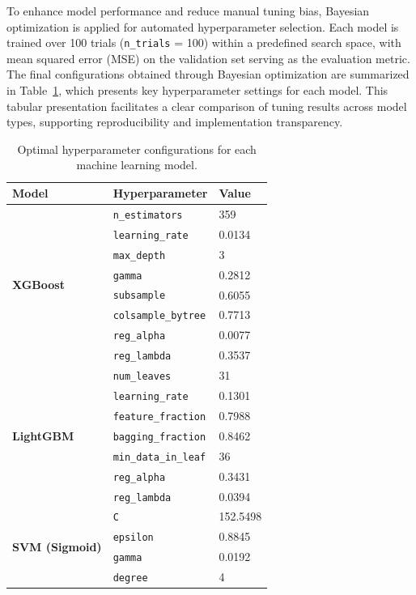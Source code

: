 To enhance model performance and reduce manual tuning bias, Bayesian optimization is applied for automated hyperparameter selection. 
Each model is trained over 100 trials (\texttt{n\_trials} = 100) within a predefined search space, with mean squared error (MSE) on the validation set serving as the evaluation metric. 
The final configurations obtained through Bayesian optimization are summarized in Table~\ref{tab:hyperparams}, which presents key hyperparameter settings for each model. 
This tabular presentation facilitates a clear comparison of tuning results across model types, supporting reproducibility and implementation transparency.

\begin{table}[!t]
    \centering
    \caption{Optimal hyperparameter configurations for each machine learning model.\label{tab:hyperparams}}
    \begin{tabular}{p{} p{} p{}<{\centering}}
        \toprule
        \textbf{Model} & \textbf{Hyperparameter} & \textbf{Value} \\
        \midrule
        \multirow{8}{*}{\textbf{XGBoost}} 
        & \texttt{n\_estimators} & 359 \\
        & \texttt{learning\_rate} & 0.0134 \\
        & \texttt{max\_depth} & 3 \\
        & \texttt{gamma} & 0.2812 \\
        & \texttt{subsample} & 0.6055 \\
        & \texttt{colsample\_bytree} & 0.7713 \\
        & \texttt{reg\_alpha} & 0.0077 \\
        & \texttt{reg\_lambda} & 0.3537 \\
        \midrule
        \multirow{7}{*}{\textbf{LightGBM}} 
        & \texttt{num\_leaves} & 31 \\
        & \texttt{learning\_rate} & 0.1301 \\
        & \texttt{feature\_fraction} & 0.7988 \\
        & \texttt{bagging\_fraction} & 0.8462 \\
        & \texttt{min\_data\_in\_leaf} & 36 \\
        & \texttt{reg\_alpha} & 0.3431 \\
        & \texttt{reg\_lambda} & 0.0394 \\
        \midrule
        \multirow{4}{*}{\textbf{SVM (Sigmoid)}} 
        & \texttt{C} & 152.5498 \\
        & \texttt{epsilon} & 0.8845 \\
        & \texttt{gamma} & 0.0192 \\
        & \texttt{degree} & 4 \\
        \bottomrule
    \end{tabular}
\end{table}


